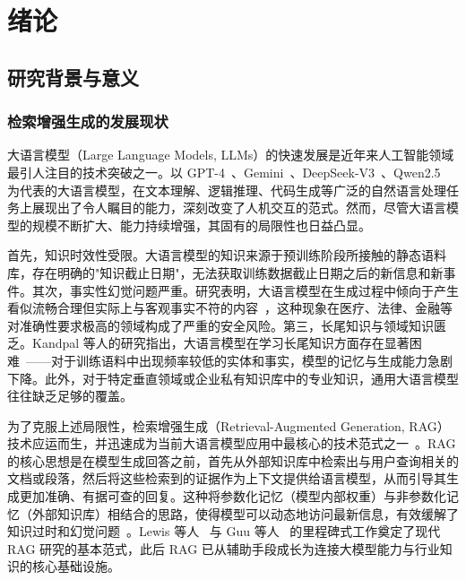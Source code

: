 \chapter{绪论}
\label{chap:introduction}

\section{研究背景与意义}

\subsection{检索增强生成的发展现状}

大语言模型（Large Language Models, LLMs）的快速发展是近年来人工智能领域最引人注目的技术突破之一。以 GPT-4~\citep{openai2023gpt4}、Gemini~\citep{geminiteam2024gemini15}、DeepSeek-V3~\citep{deepseekai2024deepseekv3}、Qwen2.5~\citep{qwen2025qwen25technicalreport} 为代表的大语言模型，在文本理解、逻辑推理、代码生成等广泛的自然语言处理任务上展现出了令人瞩目的能力，深刻改变了人机交互的范式。然而，尽管大语言模型的规模不断扩大、能力持续增强，其固有的局限性也日益凸显。

首先，知识时效性受限。大语言模型的知识来源于预训练阶段所接触的静态语料库，存在明确的"知识截止日期"，无法获取训练数据截止日期之后的新信息和新事件。其次，事实性幻觉问题严重。研究表明，大语言模型在生成过程中倾向于产生看似流畅合理但实际上与客观事实不符的内容~\citep{xu2025hallucination}，这种现象在医疗、法律、金融等对准确性要求极高的领域构成了严重的安全风险。第三，长尾知识与领域知识匮乏。Kandpal 等人的研究指出，大语言模型在学习长尾知识方面存在显著困难~\citep{kandpal2023largelanguagemodelsstruggle}——对于训练语料中出现频率较低的实体和事实，模型的记忆与生成能力急剧下降。此外，对于特定垂直领域或企业私有知识库中的专业知识，通用大语言模型往往缺乏足够的覆盖。

为了克服上述局限性，检索增强生成（Retrieval-Augmented Generation, RAG）技术应运而生，并迅速成为当前大语言模型应用中最核心的技术范式之一~\citep{gao2024retrievalaugmented}。RAG 的核心思想是在模型生成回答之前，首先从外部知识库中检索出与用户查询相关的文档或段落，然后将这些检索到的证据作为上下文提供给语言模型，从而引导其生成更加准确、有据可查的回复。这种将参数化记忆（模型内部权重）与非参数化记忆（外部知识库）相结合的思路，使得模型可以动态地访问最新信息，有效缓解了知识过时和幻觉问题~\citep{shuster2021retrieval}。Lewis 等人~\citep{lewis2020rag} 与 Guu 等人~\citep{guu2020realm} 的里程碑式工作奠定了现代 RAG 研究的基本范式，此后 RAG 已从辅助手段成长为连接大模型能力与行业知识的核心基础设施。

